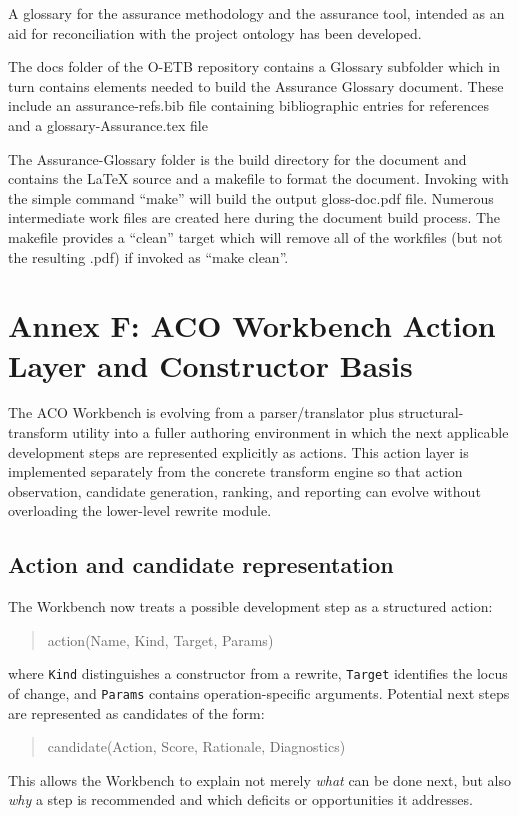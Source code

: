 \documentclass[12pt,twoside,a4paper]{article}
\begin{document}
A glossary for the assurance methodology and the assurance tool, intended as an aid for reconciliation with the project ontology has been developed.

The docs folder of the O-ETB repository contains a Glossary subfolder which in turn contains elements needed to build the Assurance Glossary document. These include an assurance-refs.bib file containing bibliographic entries for references and a glossary-Assurance.tex file

The Assurance-Glossary folder is the build directory for the document and contains the LaTeX source and a makefile to format the document. Invoking with the simple command ``make'' will build the output gloss-doc.pdf file. Numerous intermediate work files are created here during the document build process. The makefile provides a ``clean'' target which will remove all of the workfiles (but not the resulting .pdf) if invoked as ``make clean''.


\clearpage



%
\clearpage

\clearpage
\section{Annex F: ACO Workbench Action Layer and Constructor Basis}

The ACO Workbench is evolving from a parser/translator plus structural-transform utility into a fuller authoring environment in which the next applicable development steps are represented explicitly as actions.
This action layer is implemented separately from the concrete transform engine so that action observation, candidate generation, ranking, and reporting can evolve without overloading the lower-level rewrite module.

\subsection{Action and candidate representation}

The Workbench now treats a possible development step as a structured action:
\begin{quote}\ttfamily
action(Name, Kind, Target, Params)
\end{quote}
where \texttt{Kind} distinguishes a constructor from a rewrite, \texttt{Target} identifies the locus of change, and \texttt{Params} contains operation-specific arguments.
Potential next steps are represented as candidates of the form:
\begin{quote}\ttfamily
candidate(Action, Score, Rationale, Diagnostics)
\end{quote}
This allows the Workbench to explain not merely \emph{what} can be done next, but also \emph{why} a step is recommended and which deficits or opportunities it addresses.
\end{document}
